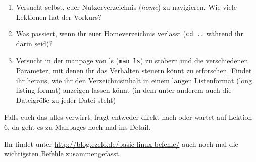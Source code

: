 \begin{spiel}
    \begin{enumerate}
        \item Versucht selbst, euer Nutzerverzeichnis (\emph{home}) zu navigieren.
              Wie viele Lektionen hat der Vorkurs?
        \item Was passiert, wenn ihr euer Homeverzeichnis verlasst (\texttt{cd ..}
              während ihr darin seid)?
        \item Versucht in der manpage von ls (\texttt{man ls}) zu stöbern und die
              verschiedenen Parameter, mit denen ihr das Verhalten steuern könnt zu
              erforschen. Findet ihr heraus, wie ihr den Verzeichnisinhalt in einem
              langen Listenformat (long listing format) anzeigen lassen könnt (in dem
              unter anderem auch die Dateigröße zu jeder Datei steht)
    \end{enumerate}

    \vspace{5em}

    Falls euch das alles verwirrt, fragt entweder direkt nach oder wartet auf
    Lektion 6, da geht es zu Manpages noch mal ins Detail.

    Ihr findet unter \url{http://blog.ezelo.de/basic-linux-befehle/} auch noch mal
    die wichtigsten Befehle zusammengefasst.
\end{spiel}